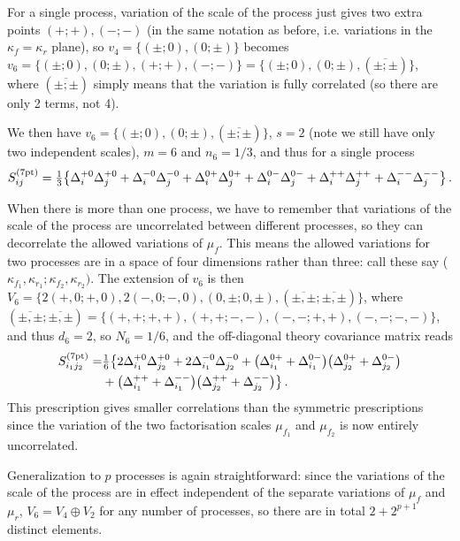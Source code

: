 \begin{itemize}
For a single process, variation of the scale of the process just gives
two extra points $(+;+),(-;-)$ (in the same notation as before,
i.e. variations in the $\kappa_f=\kappa_r$ plane), so $v_4 =\{(\pm;0),(0;\pm)\}$ becomes $v_6 = \{(\pm;0),(0;\pm),(+;+),(-;-)\} =\{(\pm;0),(0;\pm),(\overline{\pm;\pm})\}$, where $(\overline{\pm;\pm})$ simply means that the variation is fully correlated (so there are only 2 terms, not 4).

We then have $v_6 = \{(\pm;0),(0;\pm),(\overline{\pm;\pm})\}$, $s=2$ (note we still have only two independent scales), $m=6$ and $n_6 = 1/3$, and thus for a single process
\begin{equation}\label{7S}
    S^{(\rm 7pt)}_{ij} = \hbox{${{1}\over {3}}$}\big\{ \Delta_i^{+0}\Delta_j^{+0} + \Delta_i^{-0}\Delta_j^{-0} + \Delta_i^{0+}\Delta_j^{0+}  + \Delta_i^{0-}\Delta_j^{0-}  
        + \Delta_i^{++}\Delta_j^{++} + \Delta_i^{--}\Delta_j^{--}  \big\} \, .
\end{equation}
%

When there is more than one process, we have to remember that
variations of the scale of the process are uncorrelated between
different processes, so they can decorrelate the allowed variations of
$\mu_f$.
%
This means the allowed variations for two processes are in a space
of four dimensions rather than three: call these say
($\kappa_{f_1},\kappa_{r_1};\kappa_{f_2},\kappa_{r_2})$. The extension of $v_6$ is then  
$V_6=\{2(+,0;+,0),2(-,0;-,0),(0,\pm;0,\pm),(\overline{\pm,\pm};\overline{\pm,\pm})\}$, where $(\overline{\pm,\pm};\overline{\pm,\pm})=\{(+,+;+,+),(+,+;-,-),(-,-;+,+),(-,-;-,-)\}$, and thus $d_6=2$, so $N_6=1/6$, and the off-diagonal theory covariance matrix reads
\begin{equation}\label{7M}
  \begin{split}
    S^{(\rm 7pt)}_{i_1j_2} =& \hbox{${{1}\over {6}}$}\big\{ 2\Delta_{i_1}^{+0} \Delta_{j_2}^{+0}  + 2\Delta_{i_1}^{-0} \Delta_{j_2}^{-0} 
             + \big(\Delta_{i_1}^{0+}+\Delta_{i_1}^{0-}\big)\big(\Delta_{j_2}^{0+} + \Delta_{j_2}^{0-} \big)
            \\&+\big(\Delta_{i_1}^{++}+\Delta_{i_1}^{--}\big) \big(\Delta_{j_2}^{++} + \Delta_{j_2}^{--} \big) \big\} \, .
            \end{split}
\end{equation} 
This prescription gives smaller correlations than the 
symmetric prescriptions
since the variation of the two
factorisation scales $\mu_{f_1}$ and $\mu_{f_2}$ is now entirely
uncorrelated. 

Generalization to $p$ processes is again straightforward: since the
variations of the scale of the process are in effect independent of
the separate variations of $\mu_f$ and $\mu_r$, $V_6=V_4\oplus V_2$
for any number of processes, so there are in total $2+2^{p+1}$
distinct elements. 

\end{itemize}

